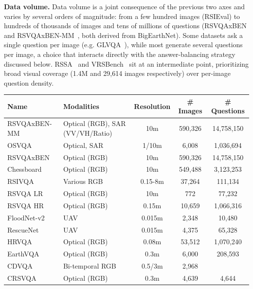 \textbf{Data volume.} Data volume is a joint consequence of the previous two axes and varies by several orders of magnitude: from a few hundred images (RSIEval) to hundreds of thousands of images and tens of millions of questions (RSVQAxBEN and RSVQAxBEN-MM~\cite{lobry2021rsvqaben,tosato2024can}, both derived from BigEarthNet). Some datasets ask a single question per image (e.g. GLVQA~\cite{guo2022glvqa}), while most generate several questions per image, a choice that interacts directly with the answer-balancing strategy discussed below. RSSA~\cite{pang2024h2rsvlm} and VRSBench~\cite{li2024vrsbench} sit at an intermediate point, prioritizing broad visual coverage (1.4M and 29,614 images respectively) over per-image question density.


\begin{table}[h]
\centering
\small
\begin{tabularx}{\textwidth}{l X c c c}
\hline
\textbf{Name} & \textbf{Modalities} & \textbf{Resolution} & \textbf{\# Images} & \textbf{\# Questions} \\
\hline
RSVQAxBEN-MM~\cite{tosato2024can} & Optical (RGB), SAR (VV/VH/Ratio) & 10m & 590,326 & 14,758,150 \\
OSVQA~\cite{zhao2024textguided} & Optical, SAR & 1/10m & 6,008 & 1,036,694 \\
RSVQAxBEN~\cite{lobry2021rsvqaben} & Optical (RGB) & 10m & 590,326 & 14,758,150 \\
Chessboard~\cite{tosato2025checkmate} & Optical (RGB) & 10m & 549,488 & 3,123,253 \\
RSIVQA~\cite{zheng2021rsivqa} & Various RGB & 0.15-8m & 37,264 & 111,134 \\
RSVQA LR~\cite{lobry2020rsvqa} & Optical (RGB) & 10m & 772 & 77,232 \\
RSVQA HR~\cite{lobry2020rsvqa} & Optical (RGB) & 0.15m & 10,659 & 1,066,316 \\
FloodNet-v2~\cite{sarkar2023floodnet} & UAV & 0.015m & 2,348 & 10,480 \\
RescueNet~\cite{sarkar2023rescuenet} & UAV & 0.015m & 4,375 & 65,328 \\
HRVQA~\cite{li2024hrvqa} & Optical (RGB) & 0.08m & 53,512 & 1,070,240 \\
EarthVQA~\cite{wang2024earthvqa} & Optical (RGB) & 0.3m & 6,000 & 208,593 \\
CDVQA~\cite{yuan2022cdvqa} & Bi-temporal RGB & 0.5/3m & 2,968 & \\
CRSVQA~\cite{zhang2023crsvqa} & Optical (RGB) & 0.3m & 4,639 & 4,644 \\

\end{tabularx}
\end{table}
